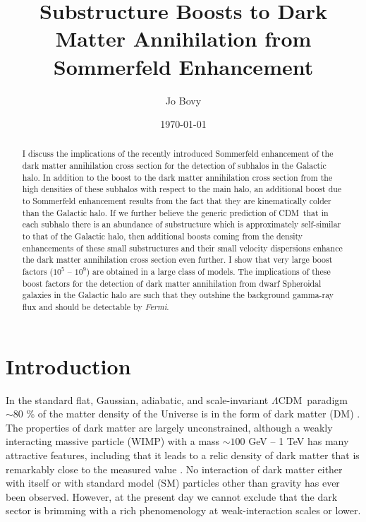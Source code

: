 \documentclass[aps,prd,twocolumn,amsmath,amssymb,floatfix,nofootinbib,10pt]{revtex4}
\newcommand{\Fermi}{\emph{Fermi}}
\newcommand{\CDM}{CDM}
\newcommand{\LCDM}{\ensuremath{\Lambda}\CDM}
\newcommand{\DM}{DM}
\newcommand{\SM}{SM}
\begin{document}
\title{Substructure Boosts to Dark Matter Annihilation from Sommerfeld Enhancement}
\author{Jo Bovy} 

\date{\today}

\begin{abstract}
I discuss the implications of the recently introduced Sommerfeld
enhancement of the dark matter annihilation cross section for the
detection of subhalos in the Galactic halo.  In addition to the boost
to the dark matter annihilation cross section from the high densities
of these subhalos with respect to the main halo, an additional boost
due to Sommerfeld enhancement results from the fact that they are
kinematically colder than the Galactic halo. If we further believe the
generic prediction of \CDM\ that in each subhalo there is an abundance
of substructure which is approximately self-similar to that of the
Galactic halo, then additional boosts coming from the density
enhancements of these small substructures and their small velocity
dispersions enhance the dark matter annihilation cross section even
further. I show that very large boost factors ($10^5$ -- $10^9$) are
obtained in a large class of models. The implications of these boost
factors for the detection of dark matter annihilation from dwarf
Spheroidal galaxies in the Galactic halo are such that they outshine
the background gamma-ray flux and should be detectable
by \Fermi.
\end{abstract}

\maketitle

\section{Introduction}
In the standard flat, Gaussian, adiabatic, and scale-invariant \LCDM\
paradigm $\sim\!80$ \% of the matter density of the Universe is in the
form of dark matter (\DM) \cite{2008arXiv0803.0547K}. The properties
of dark matter are largely unconstrained, although a weakly
interacting massive particle (WIMP) with a mass $\sim\!100$ GeV -- 1
TeV has many attractive features, including that it leads to a relic
density of dark matter that is remarkably close to the measured value
\cite{1996PhR...267..195J}. No interaction of dark matter either with
itself or with standard model (\SM) particles other than gravity has
ever been observed. However, at the present day we cannot exclude that
the dark sector is brimming with a rich phenomenology at
weak-interaction scales or lower.
\end{document}

